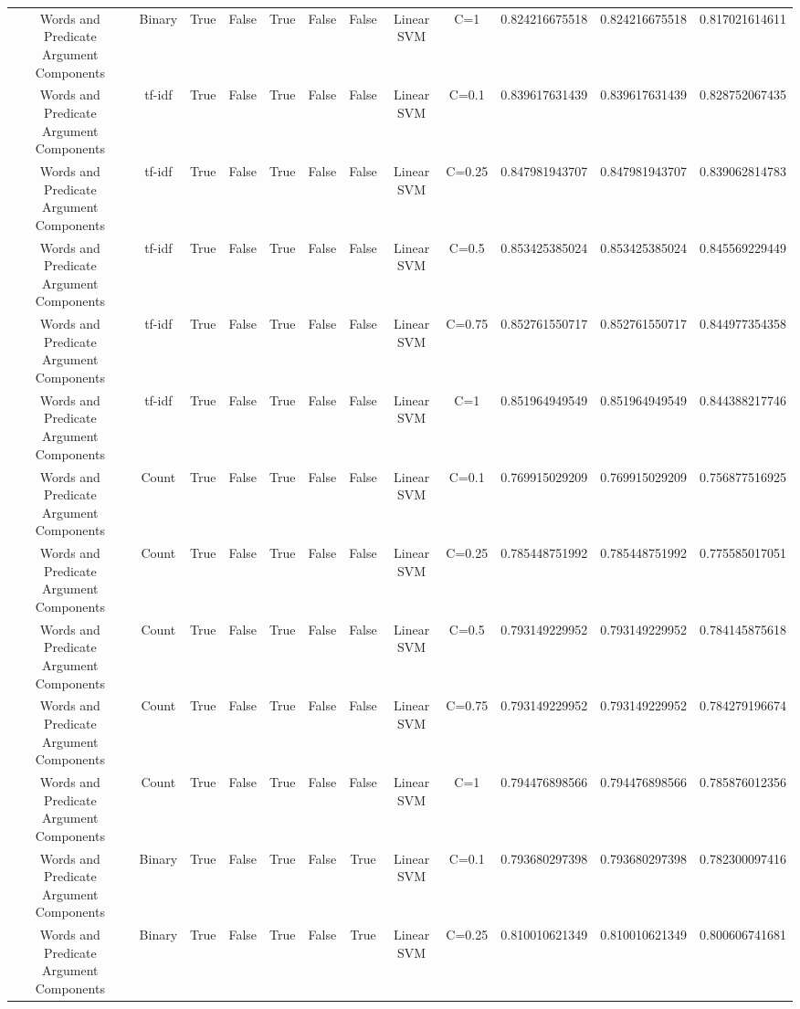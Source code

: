 \documentclass[11pt]{article}
\begin{document}
\begin{tabular}{|c|c|c|c|c|c|c|c|c|c|c|c|}
Words and Predicate Argument Components & Binary & True & False & True & False & False & Linear SVM & C=1 & 0.824216675518 & 0.824216675518 & 0.817021614611 \\ 
Words and Predicate Argument Components & tf-idf & True & False & True & False & False & Linear SVM & C=0.1 & 0.839617631439 & 0.839617631439 & 0.828752067435 \\ 
Words and Predicate Argument Components & tf-idf & True & False & True & False & False & Linear SVM & C=0.25 & 0.847981943707 & 0.847981943707 & 0.839062814783 \\ 
Words and Predicate Argument Components & tf-idf & True & False & True & False & False & Linear SVM & C=0.5 & 0.853425385024 & 0.853425385024 & 0.845569229449 \\ 
Words and Predicate Argument Components & tf-idf & True & False & True & False & False & Linear SVM & C=0.75 & 0.852761550717 & 0.852761550717 & 0.844977354358 \\ 
Words and Predicate Argument Components & tf-idf & True & False & True & False & False & Linear SVM & C=1 & 0.851964949549 & 0.851964949549 & 0.844388217746 \\ 
Words and Predicate Argument Components & Count & True & False & True & False & False & Linear SVM & C=0.1 & 0.769915029209 & 0.769915029209 & 0.756877516925 \\ 
Words and Predicate Argument Components & Count & True & False & True & False & False & Linear SVM & C=0.25 & 0.785448751992 & 0.785448751992 & 0.775585017051 \\ 
Words and Predicate Argument Components & Count & True & False & True & False & False & Linear SVM & C=0.5 & 0.793149229952 & 0.793149229952 & 0.784145875618 \\ 
Words and Predicate Argument Components & Count & True & False & True & False & False & Linear SVM & C=0.75 & 0.793149229952 & 0.793149229952 & 0.784279196674 \\ 
Words and Predicate Argument Components & Count & True & False & True & False & False & Linear SVM & C=1 & 0.794476898566 & 0.794476898566 & 0.785876012356 \\ 
Words and Predicate Argument Components & Binary & True & False & True & False & True & Linear SVM & C=0.1 & 0.793680297398 & 0.793680297398 & 0.782300097416 \\ 
Words and Predicate Argument Components & Binary & True & False & True & False & True & Linear SVM & C=0.25 & 0.810010621349 & 0.810010621349 & 0.800606741681 \\ 

\end{tabular}
\end{document}
